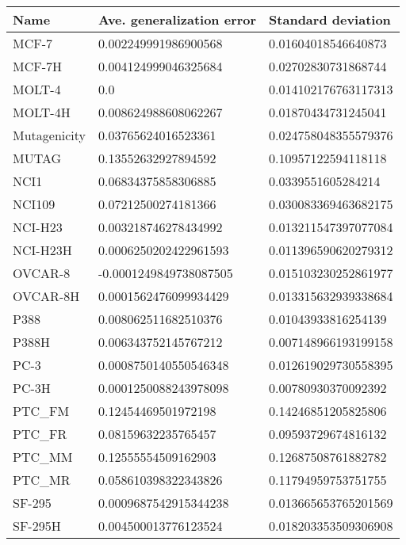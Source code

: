 \documentclass{article}
\begin{document}
\begin{table}[!ht]
    \centering
    \begin{tabular}{|l|l|l|}
    \hline
        Name & Ave. generalization error & Standard deviation \\ \hline
        MCF-7 & 0.002249991986900568 & 0.01604018546640873 \\ \hline
        MCF-7H & 0.004124999046325684 & 0.02702830731868744 \\ \hline
        MOLT-4 & 0.0 & 0.014102176763117313 \\ \hline
        MOLT-4H & 0.008624988608062267 & 0.01870434731245041 \\ \hline
        Mutagenicity & 0.03765624016523361 & 0.024758048355579376 \\ \hline
        MUTAG & 0.13552632927894592 & 0.10957122594118118 \\ \hline
        NCI1 & 0.06834375858306885 & 0.0339551605284214 \\ \hline
        NCI109 & 0.07212500274181366 & 0.030083369463682175 \\ \hline
        NCI-H23 & 0.003218746278434992 & 0.013211547397077084 \\ \hline
        NCI-H23H & 0.0006250202422961593 & 0.011396590620279312 \\ \hline
        OVCAR-8 & -0.0001249849738087505 & 0.015103230252861977 \\ \hline
        OVCAR-8H & 0.0001562476099934429 & 0.013315632939338684 \\ \hline
        P388 & 0.008062511682510376 & 0.01043933816254139 \\ \hline
        P388H & 0.006343752145767212 & 0.007148966193199158 \\ \hline
        PC-3 & 0.0008750140550546348 & 0.012619029730558395 \\ \hline
        PC-3H & 0.0001250088243978098 & 0.00780930370092392 \\ \hline
        PTC\_FM & 0.12454469501972198 & 0.14246851205825806 \\ \hline
        PTC\_FR & 0.08159632235765457 & 0.09593729674816132 \\ \hline
        PTC\_MM & 0.12555554509162903 & 0.12687508761882782 \\ \hline
        PTC\_MR & 0.058610398322343826 & 0.11794959753751755 \\ \hline
        SF-295 & 0.0009687542915344238 & 0.013665653765201569 \\ \hline
        SF-295H & 0.004500013776123524 & 0.018203353509306908 \\ \hline

\end{tabular}
\end{table}
\end{document}
